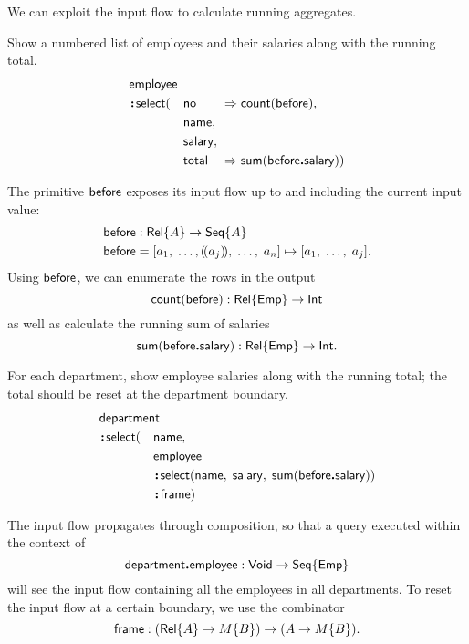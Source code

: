 We can exploit the input flow to calculate running aggregates.

\begin{demo}
    \label{ex:employee-select-no-total}
    Show a numbered list of employees and their salaries along with the running
    total.
    \begin{alignat*}{3}
        & \Employee\hidewidth && && \\
        & \Apply\Select(&& \No && \As \Count(\Before), \\
        & && \Name,\hidewidth && \\
        & && \Salary,\hidewidth &&  \\
        & && \Total && \As \Sum(\Before\To\Salary))
    \end{alignat*}
\end{demo}

The primitive $\mathsf{before}$ exposes its input flow up to and including the current
input value:
\begin{align*}
    & \mathsf{before} : \mathsf{Rel}{\left\{A\right\}} \to \mathsf{Seq}{\left\{A\right\}} \\
    & \mathsf{before} = [a_1,\;\ldots,(\!(a_j)\!),\;\ldots,\;a_n] \mapsto [a_1,\;\ldots,\;a_j].
\end{align*}
Using $\mathsf{before}$, we can enumerate the rows in the output
\begin{equation*}
    \mathsf{count}(\mathsf{before}) : \mathsf{Rel}{\left\{\mathsf{Emp}\right\}} \to \mathsf{Int}
\end{equation*}
as well as calculate the running sum of salaries
\begin{equation*}
    \mathsf{sum}(\mathsf{before}\boldsymbol{.}\mathsf{salary}) : \mathsf{Rel}{\left\{\mathsf{Emp}\right\}} \to \mathsf{Int}.
\end{equation*}

\begin{demo}
    \label{ex:department-frame-employee}
    For each department, show employee salaries along with the running total;
    the total should be reset at the department boundary.
    \begin{alignat*}{2}
        & \Department\hidewidth && \\
        & \Apply\Select(&& \Name, \\
        & && \Employee \\
        & && \Apply\Select(\Name,\; \Salary,\; \Sum(\Before\To\Salary)) \\
        & && \Apply\Frame)
    \end{alignat*}
\end{demo}

The input flow propagates through composition, so that a query executed within
the context of
\begin{equation*}
    \mathsf{department}\boldsymbol{.}\mathsf{employee} : \mathsf{Void} \to \mathsf{Seq}{\left\{\mathsf{Emp}\right\}}
\end{equation*}
will see the input flow containing all the employees in all departments.  To
reset the input flow at a certain boundary, we use the combinator
\begin{equation*}
    \mathsf{frame} : (\mathsf{Rel}{\left\{A\right\}} \to M{\left\{B\right\}}) \to (A \to M{\left\{B\right\}}).
\end{equation*}

